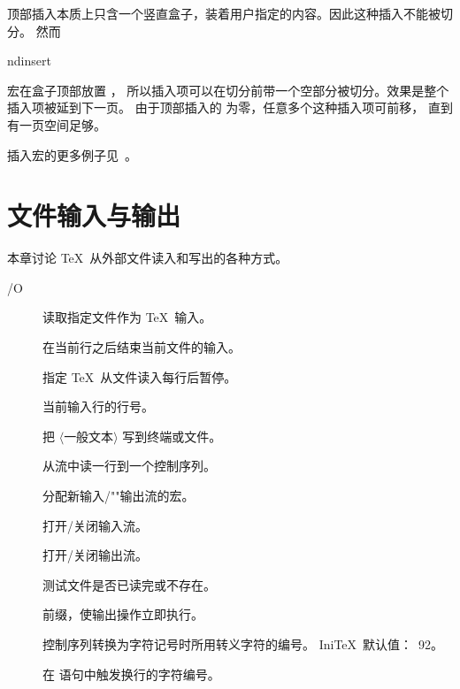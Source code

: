\documentclass[a4paper]{rapport3}
\makeatletter
\def\gr#1{$\langle$#1$\rangle$}\def\key#1{{\tt#1}}
\def\IniTeX{Ini\TeX}\def\LamsTeX{LAMS\TeX}\def\VirTeX{Vir\TeX}
\newenvironment{inventory}{\begin{description}}{\end{description}}
\def\term#1\par{\index{#1}}
\def\cstoidx#1\par{\index{#1@\cs{#1}}}
\def\csidx#1{\cstoidx #1\par\cs{#1}}
\makeatother
\begin{document}
顶部插入本质上只含一个竖直盒子，装着用户指定的内容。因此这种插入不能被切分。
然而 \csidx{endinsert} 宏在盒子顶部放置 ，
所以插入项可以在切分前带一个空部分被切分。效果是整个插入项被延到下一页。
由于顶部插入的  为零，任意多个这种插入项可前移，
直到有一页空间足够。

插入宏的更多例子见~\cite{Sal3}。



\endofchapter
\chapter{文件输入与输出}\label{io}

本章讨论 \TeX\ 从外部文件读入和写出的各种方式。
\mdqon
\term I/O\par
\mdqoff

\begin{inventory}
\item [] 
      读取指定文件作为 \TeX\ 输入。

\item [] 
      在当前行之后结束当前文件的输入。

\item [] 
      指定 \TeX\ 从文件读入每行后暂停。

\item [] 
      当前输入行的行号。


\item []   
      把 \gr{一般文本} 写到终端或文件。

\item []   
      从流中读一行到一个控制序列。

\item []
\mdqon
      分配新输入/""输出流的宏。
\mdqoff

\item []
      打开/关闭输入流。

\item []
      打开/关闭输出流。

\item []  
      测试文件是否已读完或不存在。

\item []  
      前缀，使输出操作立即执行。

\item [] 
      控制序列转换为字符记号时所用转义字符的编号。
      \IniTeX\ 默认值：~92。

\item [] 
      在  语句中触发换行的字符编号。

\end{inventory}
\end{document}
